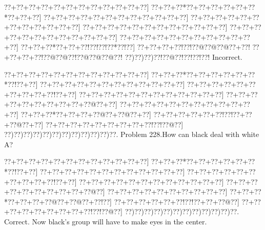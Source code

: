 \documentclass[a5paper]{article}
\begin{document}
\begin{center}
{\goo
\0??+\0??+\0??+\0??+\0??+\0??+\0??+\0??+\0??+\0??+\0??+\0??]
\0??+\0??+\0??*\0??+\0??+\0??+\0??+\0??+\0??*\0??+\0??+\0??]
\0??+\0??+\0??+\0??+\0??+\0??+\0??+\0??+\0??+\0??+\0??+\0??]
\0??+\0??+\0??+\0??+\0??+\0??+\0??+\0??+\0??+\0??+\0??+\0??]
\0??+\0??+\0??+\0??+\0??+\0??+\0??+\0??+\0??+\0??+\0??+\0??]
\0??+\0??+\0??+\0??+\0??+\0??+\0??+\0??+\0??+\0??+\0??+\0??]
\0??+\0??+\0??+\0??+\0??+\0??+\0??+\0??+\0??+\0??+\0??+\0??]
\0??+\0??+\0??*\0??+\0??+\0??!\0??!\0??!\0??*\0??!\0??]
\0??+\0??+\0??+\0??!\0??!\0??@\0??@\0??@\0??+\0??!
\0??+\0??+\0??+\0??!\0??@\0??@\0??!\0??@\0??@\0??@\0??!
\0??)\0??)\0??)\0??!\0??@\0??!\0??!\0??!\0??!
}
Incorrect. 

\end{center}
\newpage
\begin{center}
{\goo
\0??+\0??+\0??+\0??+\0??+\0??+\0??+\0??+\0??+\0??+\0??+\0??]
\0??+\0??+\0??*\0??+\0??+\0??+\0??+\0??+\0??*\0??!\0??+\0??]
\0??+\0??+\0??+\0??+\0??+\0??+\0??+\0??+\0??+\0??+\0??+\0??]
\0??+\0??+\0??+\0??+\0??+\0??+\0??+\0??+\0??+\0??!\0??+\0??]
\0??+\0??+\0??+\0??+\0??+\0??+\0??+\0??+\0??+\0??+\0??+\0??]
\0??+\0??+\0??+\0??+\0??+\0??+\0??+\0??+\0??+\0??@\0??+\0??]
\0??+\0??+\0??+\0??+\0??+\0??+\0??+\0??+\0??+\0??+\0??+\0??]
\0??+\0??+\0??*\0??+\0??+\0??+\0??@\0??+\0??@\0??+\0??]
\0??+\0??+\0??+\0??+\0??+\0??!\0??!\0??+\0??+\0??@\0??+\0??]
\0??+\0??+\0??+\0??+\0??+\0??+\0??+\0??+\0??!\0??!\0??@\0??]
\0??)\0??)\0??)\0??)\0??)\0??)\0??)\0??)\0??)\0??)\0??)\0??.
}
Problem 228.How can black deal with white A?

\end{center}
\begin{center}
{\goo
\0??+\0??+\0??+\0??+\0??+\0??+\0??+\0??+\0??+\0??+\0??+\0??]
\0??+\0??+\0??*\0??+\0??+\0??+\0??+\0??+\0??*\0??!\0??+\0??]
\0??+\0??+\0??+\0??+\0??+\0??+\0??+\0??+\0??+\0??+\0??+\0??]
\0??+\0??+\0??+\0??+\0??+\0??+\0??+\0??+\0??+\0??!\0??+\0??]
\0??+\0??+\0??+\0??+\0??+\0??+\0??+\0??+\0??+\0??+\0??+\0??]
\0??+\0??+\0??+\0??+\0??+\0??+\0??+\0??+\0??+\0??@\0??]
\0??+\0??+\0??+\0??+\0??+\0??+\0??+\0??+\0??+\0??]
\0??+\0??+\0??*\0??+\0??+\0??+\0??@\0??+\0??@\0??+\0??!\0??]
\0??+\0??+\0??+\0??+\0??+\0??!\0??!\0??+\0??+\0??@\0??]
\0??+\0??+\0??+\0??+\0??+\0??+\0??+\0??+\0??!\0??!\0??@\0??]
\0??)\0??)\0??)\0??)\0??)\0??)\0??)\0??)\0??)\0??)\0??)\0??.
}
Correct. Now black's group will have to make eyes in the center.

\end{center}
\end{document}
